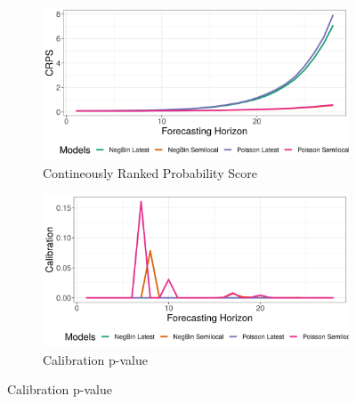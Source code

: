\begin{figure}[H]
\begin{subfigure}{0.5\textwidth}
  \centering
  \includegraphics[width=\linewidth]{../output/Mutwanga_crps.png}  
  \caption{Contineously Ranked Probability Score}
  \label{Mutwanga_scores_1}
\end{subfigure}
\begin{subfigure}{0.5\textwidth}
  \centering
  \includegraphics[width=\linewidth]{../output/Mutwanga_calibration.png}  
  \caption{Calibration p-value}
  \label{Mutwanga_scores_2}
\end{subfigure}


\end{figure}
